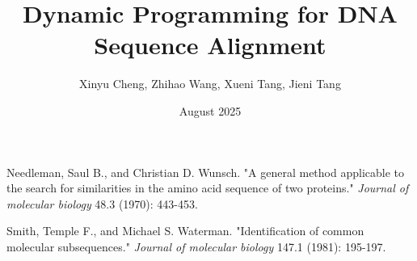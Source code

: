 \documentclass[12pt]{article}
\title{Dynamic Programming for DNA Sequence Alignment}
\author{Xinyu Cheng, Zhihao Wang, Xueni Tang, Jieni Tang}
\date{August 2025}
\begin{document}
\maketitle
\tableofcontents
\newpage


% 
% 
% 
% 
% 
% 

\newpage
\begin{thebibliography}{9}
Needleman, Saul B., and Christian D. Wunsch. "A general method applicable to the search for similarities in the amino acid sequence of two proteins." \textit{Journal of molecular biology} 48.3 (1970): 443-453.

Smith, Temple F., and Michael S. Waterman. "Identification of common molecular subsequences." \textit{Journal of molecular biology} 147.1 (1981): 195-197.
\end{thebibliography}
\end{document}
